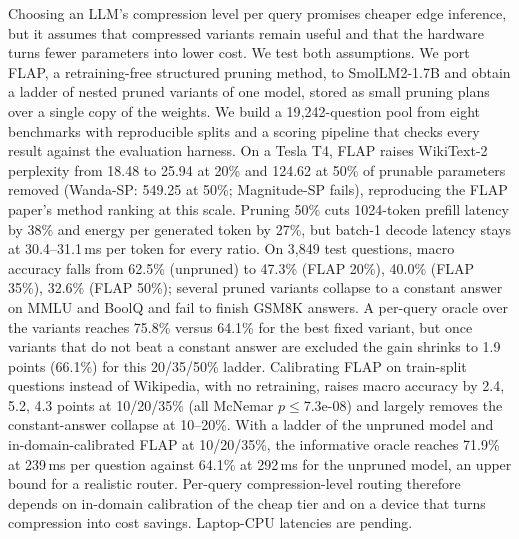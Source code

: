 Choosing an LLM's compression level per query promises cheaper edge inference, but it assumes that compressed variants remain useful and that the hardware turns fewer parameters into lower cost. We test both assumptions. We port FLAP, a retraining-free structured pruning method, to SmolLM2-1.7B and obtain a ladder of nested pruned variants of one model, stored as small pruning plans over a single copy of the weights. We build a 19{,}242-question pool from eight benchmarks with reproducible splits and a scoring pipeline that checks every result against the evaluation harness. On a Tesla T4, FLAP raises WikiText-2 perplexity from 18.48 to 25.94 at 20\% and 124.62 at 50\% of prunable parameters removed (Wanda-SP: 549.25 at 50\%; Magnitude-SP fails), reproducing the FLAP paper's method ranking at this scale. Pruning 50\% cuts 1024-token prefill latency by 38\% and energy per generated token by 27\%, but batch-1 decode latency stays at 30.4--31.1\,ms per token for every ratio. On 3{,}849 test questions, macro accuracy falls from 62.5\% (unpruned) to 47.3\% (FLAP 20\%), 40.0\% (FLAP 35\%), 32.6\% (FLAP 50\%); several pruned variants collapse to a constant answer on MMLU and BoolQ and fail to finish GSM8K answers. A per-query oracle over the variants reaches 75.8\% versus 64.1\% for the best fixed variant, but once variants that do not beat a constant answer are excluded the gain shrinks to 1.9 points (66.1\%) for this 20/35/50\% ladder. Calibrating FLAP on train-split questions instead of Wikipedia, with no retraining, raises macro accuracy by 2.4, 5.2, 4.3 points at 10/20/35\% (all McNemar $p\le$7.3e-08) and largely removes the constant-answer collapse at 10--20\%. With a ladder of the unpruned model and in-domain-calibrated FLAP at 10/20/35\%, the informative oracle reaches 71.9\% at 239\,ms per question against 64.1\% at 292\,ms for the unpruned model, an upper bound for a realistic router. Per-query compression-level routing therefore depends on in-domain calibration of the cheap tier and on a device that turns compression into cost savings. Laptop-CPU latencies are pending. 
